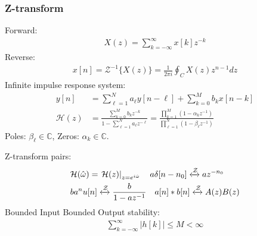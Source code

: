 \documentclass[6pt,landscape,a4paper]{article}
\begin{document}
\begin{multicols*}{5}
\subsubsection*{Z-transform}
Forward:
\vspace{-1em}
\begin{align*}
X(z) = \textstyle\sum_{k=-\infty}^{\infty} x[k] z^{-k}
\end{align*}
Reverse:
\vspace{-1em}
\begin{align*}
    x[n] = \mathcal{Z}^{-1}\{X(z)\} =  \frac{1}{2 \pi i} \textstyle\oint_{C} X(z) z^{n-1} dz
\end{align*}
Infinite impulse response system:
\begin{align*}
        y[n] &= \textstyle\sum_{\ell=1}^{N} a_{\ell} y[n-\ell] + \textstyle\sum_{k=0}^{M} b_k x[n-k]\\
\mathcal{H}(z)&= \frac{\textstyle\sum_{k=0}^{M}b_k z^{-k}}{1-\textstyle\sum_{\ell=1}^{N}a_\ell z^{-\ell}} = \frac{\prod_{k=1}^M(1-\alpha_k z^{-1})}{\prod_{\ell=1}^N(1-\beta_{\ell} z^{-1})}
\end{align*}
Poles: $\beta_{\ell} \in \mathbb{C}$, Zeros: $\alpha_k \in \mathbb{C}$.

\noindent Z-transform pairs:
\begin{align*}
&\mathcal{H}(\hat{\omega})=\left.\mathcal{H}(z)\right|_{z=e^{i\hat{\omega}}} \hspace{1em} a \delta[n-n_0] \xleftrightarrow{\mathcal{Z}} az^{-n_0} \\
& b a^n u[n] \xleftrightarrow{\mathcal{Z}} \frac{b}{1-az^{-1}} \hspace{1em} a[n]*b[n] \xleftrightarrow{\mathcal{Z}} A(z)B(z) 
\end{align*}
Bounded Input Bounded Output stability:
\begin{align*}
\textstyle\sum_{k=-\infty}^{\infty} |h[k]| \le M < \infty
\end{align*}

\end{multicols*}
\end{document}

